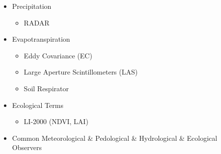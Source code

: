 \documentclass{beamer}
\begin{document}
\begin{CJK}{UTF8}{gkai}
{{  \begin{itemize}
  \item \small{Precipitation}
   
  \begin{itemize}
  \item \small{RADAR}
  \end{itemize}
 
  \item \small{Evapotranspiration}
  
  \begin{itemize}
  \item \small{Eddy Covariance (EC)}
  \item \small{Large Aperture Scintillometers (LAS)}
  \item \small{Soil Respirator}
  \end{itemize}
 
  \item \small{Ecological Terms}
 
  \begin{itemize}
  \item \small{LI-2000 (NDVI, LAI)}
  \end{itemize}
 
  \item \small{Common Meteorological \& Pedological \& Hydrological \& Ecological Observers}
  \end{itemize}
 
  }


  
  
  
  }
\end{CJK}
\end{document}
